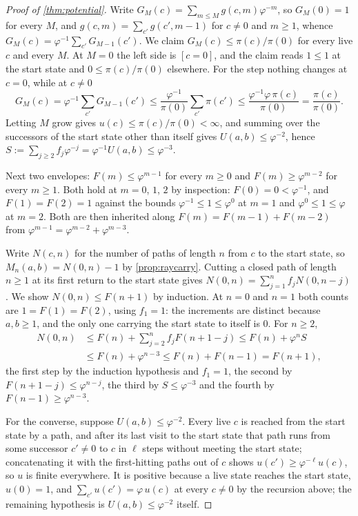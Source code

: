 \documentclass[11pt]{amsart}
\theoremstyle{definition}
\theoremstyle{remark}
\begin{document}
\begin{proof}[Proof of \cref{thm:potential}]
Write $G_M(c)=\sum_{m\le M}g(c,m)\varphi^{-m}$, so $G_M(0)=1$ for every $M$, and $g(c,m)=\sum_{c'}g(c',m-1)$ for $c\neq 0$ and $m\ge 1$, whence $G_M(c)=\varphi^{-1}\sum_{c'}G_{M-1}(c')$. We claim $G_M(c)\le\pi(c)/\pi(0)$ for every live $c$ and every $M$. At $M=0$ the left side is $[c=0]$, and the claim reads $1\le 1$ at the start state and $0\le\pi(c)/\pi(0)$ elsewhere. For the step nothing changes at $c=0$, while at $c\neq 0$
\[
G_M(c)=\varphi^{-1}\sum_{c'}G_{M-1}(c')
\le\frac{\varphi^{-1}}{\pi(0)}\sum_{c'}\pi(c')
\le\frac{\varphi^{-1}\varphi\,\pi(c)}{\pi(0)}=\frac{\pi(c)}{\pi(0)} .
\]
Letting $M$ grow gives $u(c)\le\pi(c)/\pi(0)<\infty$, and summing over the successors of the start state other than itself gives $U(a,b)\le\varphi^{-2}$, hence $S:=\sum_{j\ge2}f_j\varphi^{-j}=\varphi^{-1}U(a,b)\le\varphi^{-3}$.

Next two envelopes: $F(m)\le\varphi^{m-1}$ for every $m\ge 0$ and $F(m)\ge\varphi^{m-2}$ for every $m\ge 1$. Both hold at $m=0$, $1$, $2$ by inspection: $F(0)=0<\varphi^{-1}$, and $F(1)=F(2)=1$ against the bounds $\varphi^{-1}\le 1\le\varphi^{0}$ at $m=1$ and $\varphi^{0}\le 1\le\varphi$ at $m=2$. Both are then inherited along $F(m)=F(m-1)+F(m-2)$ from $\varphi^{m-1}=\varphi^{m-2}+\varphi^{m-3}$.

Write $N(c,n)$ for the number of paths of length $n$ from $c$ to the start state, so $M_n(a,b)=N(0,n)-1$ by \cref{prop:raycarry}. Cutting a closed path of length $n\ge 1$ at its first return to the start state gives $N(0,n)=\sum_{j=1}^{n}f_jN(0,n-j)$. We show $N(0,n)\le F(n+1)$ by induction. At $n=0$ and $n=1$ both counts are $1=F(1)=F(2)$, using $f_1=1$: the increments are distinct because $a,b\ge 1$, and the only one carrying the start state to itself is $0$. For $n\ge 2$,
\[
\begin{aligned}
N(0,n)&\le F(n)+\sum_{j=2}^{n}f_jF(n+1-j)\le F(n)+\varphi^{n}S\\
&\le F(n)+\varphi^{n-3}\le F(n)+F(n-1)=F(n+1),
\end{aligned}
\]
the first step by the induction hypothesis and $f_1=1$, the second by $F(n+1-j)\le\varphi^{n-j}$, the third by $S\le\varphi^{-3}$ and the fourth by $F(n-1)\ge\varphi^{n-3}$.

For the converse, suppose $U(a,b)\le\varphi^{-2}$. Every live $c$ is reached from the start state by a path, and after its last visit to the start state that path runs from some successor $c'\neq 0$ to $c$ in $\ell$ steps without meeting the start state; concatenating it with the first-hitting paths out of $c$ shows $u(c')\ge\varphi^{-\ell}u(c)$, so $u$ is finite everywhere. It is positive because a live state reaches the start state, $u(0)=1$, and $\sum_{c'}u(c')=\varphi\,u(c)$ at every $c\neq 0$ by the recursion above; the remaining hypothesis is $U(a,b)\le\varphi^{-2}$ itself.
\end{proof}
\end{document}
